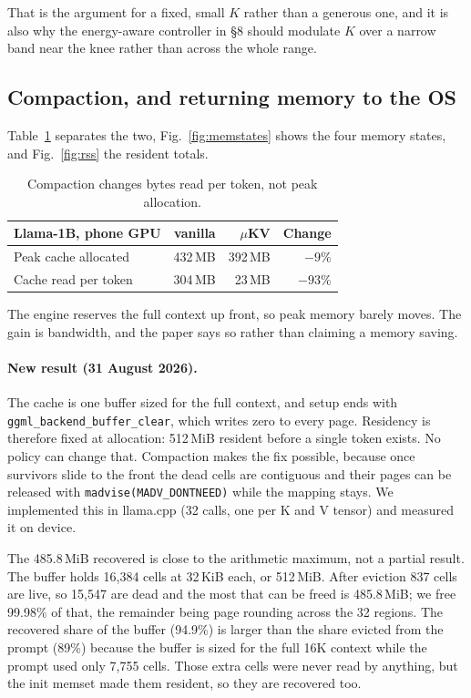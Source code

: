 \documentclass[11pt]{article}
\begin{document}
That is the argument for a fixed, small $K$ rather than a generous one, and it is also why the
energy-aware controller in \S8 should modulate $K$ over a narrow band near the knee rather
than across the whole range.

\subsection{Compaction, and returning memory to the OS}
Table~\ref{tab:compact} separates the two, Fig.~\ref{fig:memstates} shows the four memory states, and Fig.~\ref{fig:rss} the resident totals.
\begin{table}[h]\centering\small
\caption{Compaction changes bytes read per token, not peak allocation.}
\label{tab:compact}
\begin{tabular}{@{}lrrr@{}}
\toprule
\textbf{Llama-1B, phone GPU} & \textbf{vanilla} & \textbf{$\mu$KV} & \textbf{Change}\\
\midrule
Peak cache allocated & 432\,MB & 392\,MB & $-9\%$\\
\rowcolor{cA!8} Cache read per token & 304\,MB & 23\,MB & $-93\%$\\
\bottomrule
\end{tabular}
\end{table}

\noindent The engine reserves the full context up front, so peak memory barely moves. The
gain is bandwidth, and the paper says so rather than claiming a memory saving.

\paragraph{New result (31 August 2026).} The cache is one buffer sized for the full context,
and setup ends with \texttt{ggml\_backend\_buffer\_clear}, which writes zero to every page.
Residency is therefore fixed at allocation: 512\,MiB resident before a single token exists.
No policy can change that. Compaction makes the fix possible, because once survivors slide to
the front the dead cells are contiguous and their pages can be released with
\texttt{madvise(MADV\_DONTNEED)} while the mapping stays. We implemented this in llama.cpp
(32 calls, one per K and V tensor) and measured it on device.

The 485.8\,MiB recovered is close to the arithmetic maximum, not a partial result. The buffer
holds 16{,}384 cells at 32\,KiB each, or 512\,MiB. After eviction 837 cells are live, so 15{,}547
are dead and the most that can be freed is 485.8\,MiB; we free 99.98\% of that, the remainder
being page rounding across the 32 regions. The recovered share of the buffer (94.9\%) is larger
than the share evicted from the prompt (89\%) because the buffer is sized for the full 16K
context while the prompt used only 7{,}755 cells. Those extra cells were never read by anything,
but the init memset made them resident, so they are recovered too.
\end{document}
